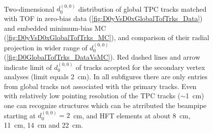 \begin{figure}[b!]
\parbox{0.4725\textwidth}{
  \centering
  \begin{subfigure}[b]{\linewidth}\addtocounter{subfigure}{-2}
  \end{subfigure}\\
  \begin{minipage}[t][1.042\linewidth][t]{\linewidth}\vspace{10pt}
    \caption[Comparison of $d_{0}^{(0,0)}$ distribution of global TPC tracks matched with TOF in zero-bias data and embedded MC (minimum-bias).]{Two-dimensional $d_{0}^{(0,0)}$ distribution of global TPC tracks matched with TOF in zero-bias data (\ref{fig:D0yVsD0xGlobalTofTrks_Data}) and embedded minimum-bias MC (\ref{fig:D0yVsD0xGlobalTofTrks_MC}), and comparison of their radial projection in wider range of $d_{0}^{(0,0)}$ (\ref{fig:D0GlobalTofTrks_DataVsMC}). Red dashed lines and arrow indicate limit of $d_{0}^{(0,0)}$ of tracks accepted for the secondary vertex analyses (limit equals 2~cm). In all subfigures there are only entries from global tracks not associated with the primary tracks. Even with relatively low pointing resolution of the TPC tracks ($\sim$1~cm) one can recognize structures which can be atrributed the beampipe starting at $d_{0}^{(0,0)}=2$~cm, and HFT elements at about 8~cm, 11~cm, 14~cm and 22~cm.}\label{fig:deadMatDataVsMC2}
  \end{minipage}
}\vspace{-30pt}%
\end{figure}

